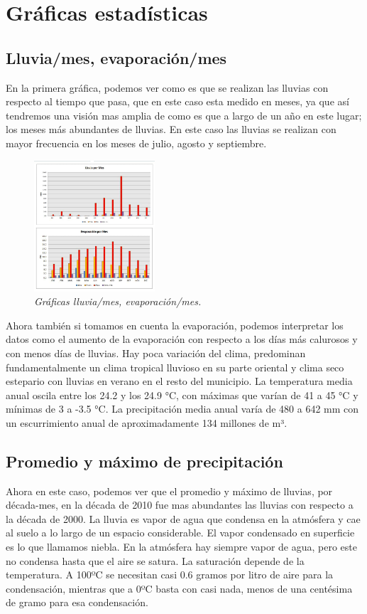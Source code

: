 \documentclass[12pt]{article}
\begin{document}
    
    
\section{Gráficas estadísticas }

\subsection{Lluvia/mes, evaporación/mes }
	En la primera gráfica, podemos ver como es que se realizan las lluvias con respecto al tiempo que pasa, que en este caso esta medido en meses, ya que así tendremos una visión mas amplia de como es que a largo de un año en este lugar; los meses más abundantes de lluvias. En este caso las lluvias se realizan con mayor frecuencia en los meses de julio, agosto y septiembre. 
   
\begin{figure} 
\includegraphics[width=0.4\textwidth]{Lluvias.jpeg}
\caption{\textit{Gráficas lluvia/mes, evaporación/mes.}}
\end{figure}

Ahora también si tomamos en cuenta la evaporación, podemos interpretar los datos como el aumento de la evaporación con respecto a los días más calurosos y con menos días de lluvias. Hay poca variación del clima, predominan fundamentalmente un clima tropical lluvioso en su parte oriental y clima seco estepario con lluvias en verano en el resto del municipio.
La temperatura media anual oscila entre los 24.2 y los 24.9 °C, con máximas que varían de 41 a 45 °C y mínimas de 3 a -3.5 °C. La precipitación media anual varía de 480 a 642 mm con un escurrimiento anual de aproximadamente 134 millones de m³.

\subsection{Promedio y máximo de precipitación}
Ahora en este caso, podemos ver que el promedio y máximo de lluvias, por década-mes, en la década de 2010 fue mas abundantes las lluvias con respecto a la década de 2000. 
La lluvia es vapor de agua que condensa en la atmósfera y cae al suelo a lo largo de un espacio considerable. 
El vapor condensado en superficie es lo que llamamos niebla. En la atmósfera hay siempre vapor de agua, pero este no condensa hasta que el aire se satura. 
La saturación depende de la temperatura.  A 100ºC se necesitan casi 0.6 gramos por litro de aire para la condensación, mientras que a 0ºC basta con casi nada, menos de una centésima de gramo para esa condensación. 
\end{document}
